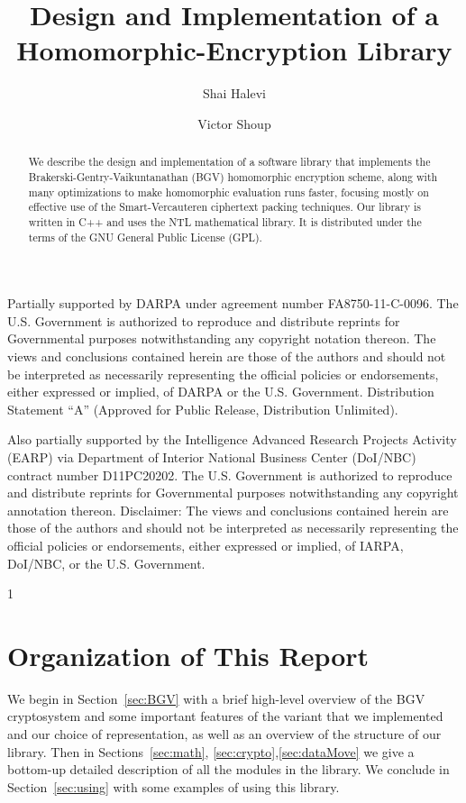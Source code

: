 \documentclass[14pt]{extarticle}
\newcommand{\secref}[1]{Section~\protect\ref{sec:#1}}
\begin{document}
\sloppy %

\pagestyle{empty}
\begin{titlepage}
\title{Design and Implementation of a Homomorphic-Encryption Library}
\author{Shai Halevi \and Victor Shoup}
\maketitle

\begin{abstract}
We describe the design and implementation of a software library that
implements the Brakerski-Gentry-Vaikuntanathan (BGV) homomorphic
encryption scheme, along with many optimizations to make homomorphic
evaluation runs faster, focusing mostly on effective use of the
Smart-Vercauteren ciphertext packing techniques. Our library is
written in C++ and uses the NTL mathematical library. It is distributed
under the terms of the GNU General Public License (GPL).
\end{abstract}

\bigskip\bigskip\noindent
Partially supported by DARPA under agreement number
FA8750-11-C-0096. The U.S. Government is authorized to reproduce and
distribute reprints for Governmental purposes notwithstanding any
copyright notation thereon. The views and conclusions contained herein
are those of the authors and should not be interpreted as necessarily
representing the official policies or endorsements, either expressed
or implied, of DARPA or the U.S. Government. 
Distribution Statement ``A'' (Approved for Public Release,
Distribution Unlimited).

Also partially supported by the Intelligence Advanced Research
Projects Activity (EARP) via Department of Interior National Business
Center (DoI/NBC) contract number D11PC20202. The U.S. Government is
authorized to reproduce and distribute reprints for Governmental
purposes notwithstanding any copyright annotation thereon. Disclaimer:
The views and conclusions contained herein are those of the authors
and should not be interpreted as necessarily representing the official
policies or endorsements, either expressed or implied, of IARPA,
DoI/NBC, or the U.S. Government.
\end{titlepage}

\tableofcontents
\newpage
\pagestyle{plain}
\setcounter{page}1

\section*{Organization of This Report}
We begin in \secref{BGV} with a brief high-level overview of the
BGV cryptosystem and some important features of the variant that we
implemented and our choice of representation, as well as an overview
of the structure of our library. Then in Sections~\ref{sec:math},
\ref{sec:crypto},\ref{sec:dataMove} we give a bottom-up detailed
description of all the modules in the library. We conclude in
\secref{using} with some examples of using this library.
\end{document}
